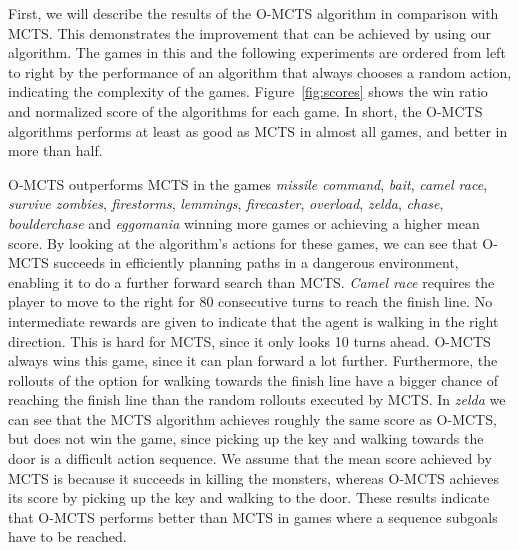 First, we will describe the results of the O-MCTS algorithm in comparison with
MCTS\@.  This demonstrates the improvement that can be achieved by using our
algorithm.  The games in this and the following
experiments are ordered from left to right by the performance of an algorithm
that always chooses a random action, indicating the complexity of the games.
Figure~\ref{fig:scores} shows the win ratio and normalized score of the
algorithms for each game. In short, the O-MCTS algorithms performs at least as
good as MCTS in almost all games, and better in more than half.

O-MCTS outperforms MCTS in the games \textit{missile command}, \textit{bait},
\textit{camel race}, \textit{survive zombies}, \textit{firestorms},
\textit{lemmings}, \textit{firecaster}, \textit{overload}, \textit{zelda},
\textit{chase}, \textit{boulderchase} and \textit{eggomania} winning more games
or achieving a higher mean score. By looking at the algorithm's actions for
these games, we can see that O-MCTS succeeds in efficiently planning paths in a
dangerous environment, enabling it to do a further forward search than MCTS\@. 
\textit{Camel race} requires the player to
move to the right for 80 consecutive turns to reach the finish line. No
intermediate rewards are given to indicate that the agent is walking in the
right direction. This is hard for MCTS, since it only looks 10 turns ahead.
O-MCTS always wins this game, since it can plan forward a lot further.
Furthermore, the rollouts of the option for walking towards the finish line have
a bigger chance of reaching the finish line than the random rollouts executed by
MCTS\@.
In \textit{zelda} we can see that the MCTS algorithm achieves roughly the same
score as O-MCTS, but does not win the game, since picking up the key and walking
towards the door is a difficult action sequence.  We assume that the mean score
achieved by MCTS is because it succeeds in killing the monsters, whereas O-MCTS
achieves its score by picking up the key and walking to the door.  These results
indicate that O-MCTS performs better than MCTS in games where a sequence
subgoals have to be reached.

